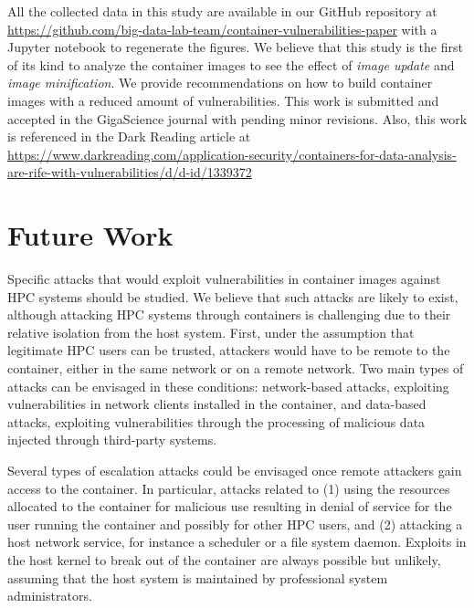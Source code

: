All the collected
data in this study are available in our GitHub repository at
\url{https://github.com/big-data-lab-team/container-vulnerabilities-paper}
with a Jupyter notebook to regenerate the figures.
We believe that this
study is the first of its kind to analyze the container images to see
the effect of \textit{image update} and \textit{image minification}.
We provide recommendations on how to build container
images with a reduced amount of vulnerabilities. This work is
submitted and accepted in the GigaScience journal with pending
minor revisions. Also, this work is referenced in the Dark Reading
article at \href{https://www.darkreading.com/application-security/containers-for-data-analysis-are-rife-with-vulnerabilities/d/d-id/1339372}
{https://www.darkreading.com/application-security/containers-for-data-analysis-are-rife-with-vulnerabilities/d/d-id/1339372}

\section{Future Work}

Specific attacks that would exploit vulnerabilities in container images 
against HPC systems should be studied. We
believe that such attacks are likely to exist, although attacking HPC
systems through containers is challenging due to their relative isolation
from the host system. First, under the assumption that legitimate HPC
users can be trusted, attackers would have to be remote to the container,
either in the same network or on a remote network. Two main types of
attacks can be envisaged in these conditions: network-based attacks,
exploiting vulnerabilities in network clients installed in the container,
and data-based attacks, exploiting vulnerabilities through the processing
of malicious data injected through third-party systems.

Several types of escalation attacks could be envisaged once remote
attackers gain access to the container. In particular, attacks related
to (1) using the resources allocated to the container for malicious use resulting in denial of service
for the user running the container and possibly for other HPC users, and
(2) attacking a host network service, for instance a scheduler or a file
system daemon. 
Exploits in the host kernel to break out of the container
are always possible but unlikely, assuming that the host system is
maintained by professional system administrators.

